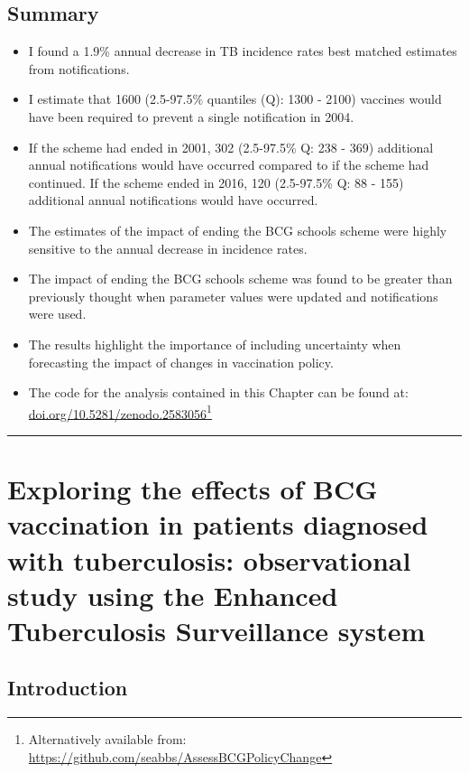 \documentclass[11pt,twoside]{bristolthesis}
\begin{document}
  \hypertarget{summary-4}{%
  \section{Summary}\label{summary-4}}
  \begin{itemize}
  \item
    I found a 1.9\% annual decrease in TB incidence rates best matched estimates from notifications.
  \item
    I estimate that 1600 (2.5-97.5\% quantiles (Q): 1300 - 2100) vaccines would have been required to prevent a single notification in 2004.
  \item
    If the scheme had ended in 2001, 302 (2.5-97.5\% Q: 238 - 369) additional annual notifications would have occurred compared to if the scheme had continued. If the scheme ended in 2016, 120 (2.5-97.5\% Q: 88 - 155) additional annual notifications would have occurred.
  \item
    The estimates of the impact of ending the BCG schools scheme were highly sensitive to the annual decrease in incidence rates.
  \item
    The impact of ending the BCG schools scheme was found to be greater than previously thought when parameter values were updated and notifications were used.
  \item
    The results highlight the importance of including uncertainty when forecasting the impact of changes in vaccination policy.
  \item
    The code for the analysis contained in this Chapter can be found at:
    \href{https://doi.org/10.5281/zenodo.2583056}{doi.org/10.5281/zenodo.2583056}\footnote{Alternatively available from: \url{https://github.com/seabbs/AssessBCGPolicyChange}}
  \end{itemize}
  \begin{center}\rule{0.5\linewidth}{\linethickness}\end{center}
  
  \hypertarget{beneficial-bcg-out}{%
  \chapter{Exploring the effects of BCG vaccination in patients diagnosed with tuberculosis: observational study using the Enhanced Tuberculosis Surveillance system}\label{beneficial-bcg-out}}
  
  \hypertarget{introduction-4}{%
  \section{Introduction}\label{introduction-4}}
  
\end{document}
